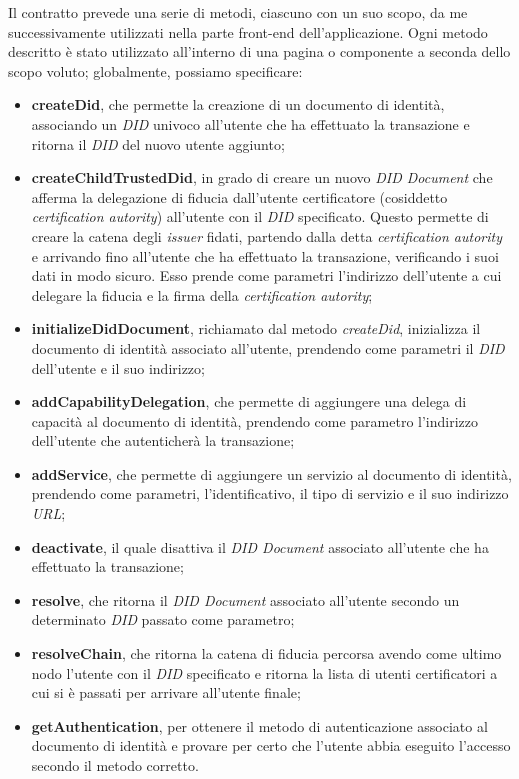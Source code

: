 Il contratto prevede una serie di metodi, ciascuno con un suo scopo, da me successivamente utilizzati nella parte front-end dell'applicazione.
Ogni metodo descritto è stato utilizzato all'interno di una pagina o componente a seconda dello scopo voluto; globalmente, possiamo specificare:
\begin{itemize}
    \item \textbf{createDid}, che permette la creazione di un documento di identità, associando un \textit{DID} univoco all'utente che ha effettuato la transazione e ritorna il \textit{DID} del nuovo utente aggiunto;
    \item \textbf{createChildTrustedDid}, in grado di creare un nuovo \textit{DID Document} che afferma la delegazione di fiducia dall'utente certificatore (cosiddetto \textit{certification autority}) all'utente con il \textit{DID} specificato.
    Questo permette di creare la catena degli \textit{issuer} fidati, partendo dalla detta \textit{certification autority} e arrivando fino all'utente che ha effettuato la transazione, verificando i suoi dati in modo sicuro.
    Esso prende come parametri l'indirizzo dell'utente a cui delegare la fiducia e la firma della \textit{certification autority};
    \item \textbf{initializeDidDocument}, richiamato dal metodo \textit{createDid}, inizializza il documento di identità associato all'utente, prendendo come parametri il \textit{DID} dell'utente e il suo indirizzo;
    \item \textbf{addCapabilityDelegation}, che permette di aggiungere una delega di capacità al documento di identità, prendendo come parametro l'indirizzo dell'utente che autenticherà la transazione;
    \item \textbf{addService}, che permette di aggiungere un servizio al documento di identità, prendendo come parametri, l'identificativo, il tipo di servizio e il suo indirizzo \textit{URL};
    \item \textbf{deactivate}, il quale disattiva il \textit{DID Document} associato all'utente che ha effettuato la transazione;
    \item \textbf{resolve}, che ritorna il \textit{DID Document} associato all'utente secondo un determinato \textit{DID} passato come parametro;
    \item \textbf{resolveChain}, che ritorna la catena di fiducia percorsa avendo come ultimo nodo l'utente con il \textit{DID} specificato e ritorna la lista di utenti certificatori a cui si è passati per arrivare all'utente finale;
    \item \textbf{getAuthentication}, per ottenere il metodo di autenticazione associato al documento di identità e provare per certo che l'utente abbia eseguito l'accesso secondo il metodo corretto.
\end{itemize}


